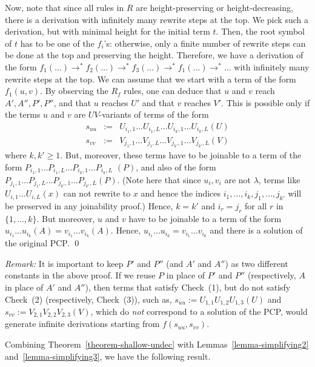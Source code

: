 \documentclass{LMCS}
\theoremstyle{plain}
\begin{document}
Now, note that since all rules in $R$ are height-preserving or 
height-decreasing,
there is a derivation with infinitely many rewrite steps at the top.
We pick such a derivation, but with minimal height for
the initial term $t$. 
Then, the root symbol of $t$ has to be one of the
$f_i$'s: otherwise, only a finite number of rewrite
steps can be done at the top
and preserving the height.
Therefore, we have a derivation of the form
$f_1(\ldots)\rightarrow^* f_2(\ldots)\rightarrow^* f_3(\ldots)\rightarrow^*
f_1(\ldots)\rightarrow^*\ldots$ with infinitely many rewrite
steps at the top. We can assume that we start
with a term of the form $f_1(u,v)$. By observing the $R_f$ rules,
one can deduce that $u$ and $v$ reach $A',A'',P',P''$, and that
$u$ reaches $U'$ and that $v$ reaches $V'$.
This is possible only if the terms $u$ and $v$ are
$UV$-variants of terms of the form
\begin{eqnarray*}
 s_{uu} & := & U_{i_1,1}\ldots U_{i_1,L}\ldots U_{i_k,1}\ldots U_{i_k,L}(U)
\\
 s_{vv} & := & V_{j_1,1}\ldots V_{j_1,L}\ldots V_{j_{k'},1}\ldots V_{j_{k'},L}(V)
\end{eqnarray*}
where $k,k'\geq 1$.
But, moreover, these terms have to be joinable to a term of the form
$P_{i_1,1}\ldots P_{i_1,L}\ldots P_{i_k,1}\ldots P_{i_k,L}$ $(P)$,
and also of the form $P_{j_1,1}\ldots P_{j_1,L}\ldots
P_{j_{k'},1}\ldots P_{j_{k'},L}(P)$. 
(Note here that since $u_i,v_i$ are not $\lambda$, terms like
$U_{i,1}\ldots U_{i,L}(x)$ can not rewrite to $x$ and hence
the indices $i_1,\ldots,i_k,j_1,\ldots,j_{k'}$ will be preserved
in any joinability proof.)
Hence, $k=k'$ and $i_r=j_r$ for all $r$ in $\{1,\ldots,k\}$. But moreover,
$u$ and $v$ have to be joinable to a term of the form
$u_{i_1}\ldots u_{i_k}(A)=v_{i_1}\ldots v_{i_k}(A)$. Hence,
$u_{i_1}\ldots u_{i_k}=v_{i_1}\ldots v_{i_k}$ and there is a solution
of the original PCP.  \qed


\noindent
{\em Remark:}
It is important to keep $P'$ and $P''$ (and $A'$ and $A''$) as two different
constants in the above proof.  If we reuse $P$ in place of $P'$ and $P''$
(respectively, $A$ in place of $A'$ and $A''$),
then terms that satisfy Check~(1), but do not satisfy Check~(2) 
(respectively, Check~(3)), such as, 
$s_{uu} := U_{1,1}U_{1,2}U_{1,3}(U)$ and $s_{vv} := V_{2,1}V_{2,2}V_{2,3}(V)$, 
which do {\em{not}} correspond to a solution of the PCP,
would generate infinite derivations  starting from $f(s_{uu},s_{vv})$.

Combining Theorem~\ref{theorem-shallow-undec} with 
Lemmas~\ref{lemma-simplifying2}
and~\ref{lemma-simplifying3}, we have the following result.
\end{document}
